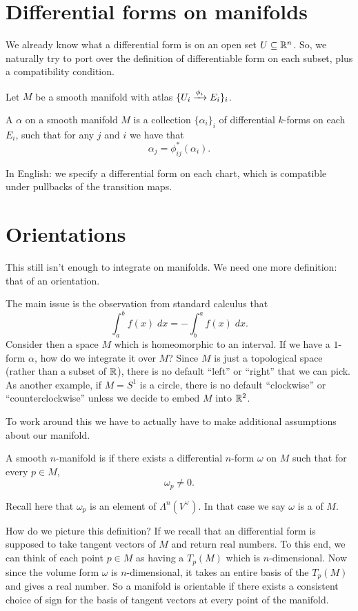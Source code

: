 \section{Differential forms on manifolds}
We already know what a differential form is on an open set $U \subseteq \mathbb R^n$.
So, we naturally try to port over the definition of
differentiable form on each subset, plus a compatibility condition.

Let $M$ be a smooth manifold with atlas $\{ U_i \xrightarrow{\phi_i} E_i \}_i$.

\begin{definition}
	A  $\alpha$ on a smooth manifold $M$
	is a collection $\{\alpha_i\}_i$ of differential $k$-forms on each $E_i$,
	such that for any $j$ and $i$ we have that
	\[ \alpha_j = \phi_{ij}^\ast(\alpha_i). \]
\end{definition}
In English: we specify a differential form on each chart,
which is compatible under pullbacks of the transition maps.

\section{Orientations}

This still isn't enough to integrate on manifolds.
We need one more definition: that of an orientation.

The main issue is the observation from standard calculus that
\[ \int_a^b f(x) \; dx = - \int_b^a f(x) \; dx. \]
Consider then a space $M$ which is homeomorphic to an interval.
If we have a $1$-form $\alpha$, how do we integrate it over $M$?
Since $M$ is just a topological space (rather than a subset of $\mathbb R$),
there is no default ``left'' or ``right'' that we can pick.
As another example, if $M = S^1$ is a circle, there is
no default ``clockwise'' or ``counterclockwise'' unless we decide
to embed $M$ into $\mathbb R^2$.

To work around this we have to actually have to
make additional assumptions about our manifold.
\begin{definition}
	A smooth $n$-manifold is  if
	there exists a differential $n$-form $\omega$ on $M$
	such that for every $p \in M$,
	\[ \omega_p \neq 0. \]
\end{definition}
Recall here that $\omega_p$ is an element of $\Lambda^n(V^\vee)$.
In that case we say $\omega$ is a  of $M$.

How do we picture this definition?
If we recall that an differential form is supposed to take
tangent vectors of $M$ and return real numbers.
To this end, we can think of each point $p \in M$ as
having a  $T_p(M)$ which is $n$-dimensional.
Now since the volume form $\omega$ is $n$-dimensional,
it takes an entire basis of the $T_p(M)$ and gives a real number.
So a manifold is orientable if there exists a consistent choice of
sign for the basis of tangent vectors at every point of the manifold.

